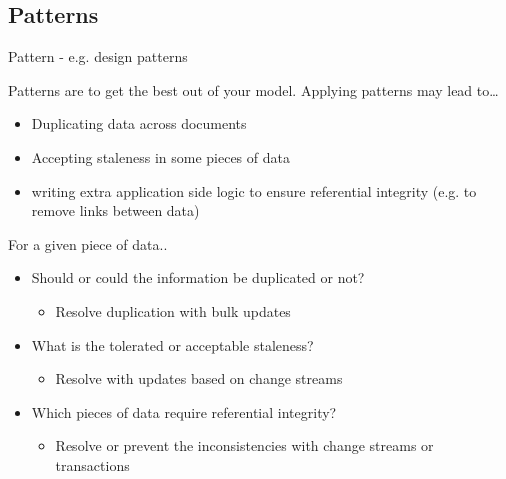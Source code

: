 \documentclass[11pt]{article}
\begin{document}
\subsection{Patterns}
\label{sec:org5e7a496}
Pattern - e.g. design patterns

Patterns are to get the best out of your model. Applying patterns may lead to\ldots{}
\begin{itemize}
\item Duplicating data across documents
\item Accepting staleness in some pieces of data
\item writing extra application side logic to ensure referential integrity (e.g. to remove links between data)
\end{itemize}

For a given piece of data..
\begin{itemize}
\item Should or could the information be duplicated or not?
\begin{itemize}
\item Resolve duplication with bulk updates
\end{itemize}
\item What is the tolerated or acceptable staleness? 
\begin{itemize}
\item Resolve with updates based on change streams
\end{itemize}
\item Which pieces of data require referential integrity?
\begin{itemize}
\item Resolve or prevent the inconsistencies with change streams or transactions
\end{itemize}
\end{itemize}
\end{document}
